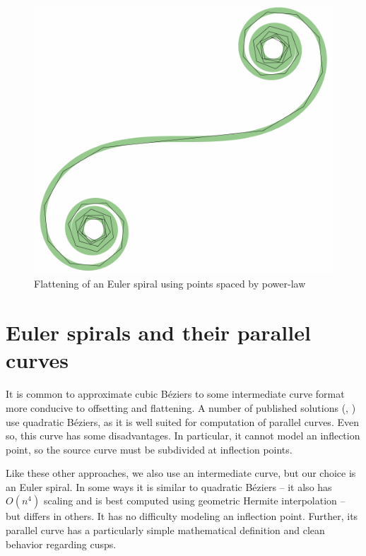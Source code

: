 \documentclass[sigconf]{acmart}
\begin{document}
\begin{figure}
    \includegraphics[scale=0.3]{es_flatten}
    \caption{Flattening of an Euler spiral using points spaced by power-law}
    \label{fig:es_flatten}
\end{figure}


\section{Euler spirals and their parallel curves}

It is common to approximate cubic Béziers to some intermediate curve format more conducive to offsetting and flattening. A number of published solutions (\citet{Yzerman2020}, \citet{Nehab2020}) use quadratic Béziers, as it is well suited for computation of parallel curves. Even so, this curve has some disadvantages. In particular, it cannot model an inflection point, so the source curve must be subdivided at inflection points.

Like these other approaches, we also use an intermediate curve, but our choice is an Euler spiral. In some ways it is similar to quadratic Béziers -- it also has $O(n^4)$ scaling and is best computed using geometric Hermite interpolation -- but differs in others. It has no difficulty modeling an inflection point. Further, its parallel curve has a particularly simple mathematical definition and clean behavior regarding cusps.
\end{document}
